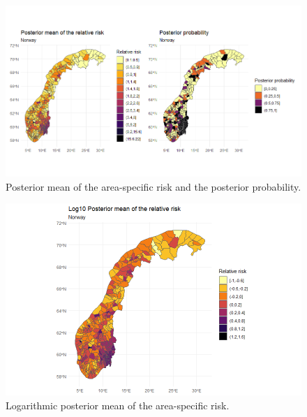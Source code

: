 \begin{figure}[H]
    \centering
    \includegraphics[width = \textwidth]{posterior_norway_all.png}
    \caption{Posterior mean of the area-specific risk and the posterior probability.}
    \label{posteriorNorwayAll}
\end{figure}
%     
\begin{figure}[H]
    \centering
    \includegraphics[width = \textwidth]{posterior_norway_all_log.png}
    \caption{Logarithmic posterior mean of the area-specific risk.}
    \label{posteriorNorwayAllLog}
\end{figure}
%     
